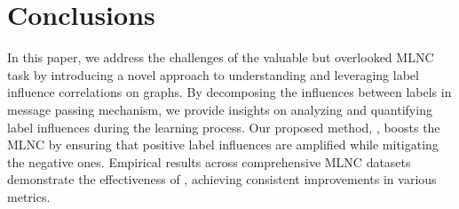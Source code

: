 \section{Conclusions}  
In this paper, we address the challenges of the valuable but overlooked MLNC task by introducing a novel approach to understanding and leveraging label influence correlations on graphs. 
By decomposing the influences between labels in message passing mechanism, we provide insights on analyzing and quantifying label influences during the learning process. 
Our proposed method, \model, boosts the MLNC by ensuring that positive label influences are amplified while mitigating the negative ones. 
Empirical results across comprehensive MLNC datasets demonstrate the effectiveness of \model, achieving consistent improvements in various metrics. 





